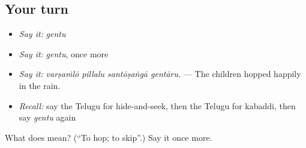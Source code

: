 \subsection*{Your turn}
\begin{itemize}
\raggedright
  \item \emph{Say it:} \emph{gentu}
  \item \emph{Say it:} \emph{gentu}, once more
  \item \emph{Say it:} \emph{varṣaṁlō pillalu santōṣaṅgā gentāru.} — The children hopped happily in the rain.
  \item \emph{Recall:} say the Telugu for hide-and-seek, then the Telugu for kabaddi, then say \emph{gentu} again
\end{itemize}

\begin{tcolorbox}[breakable,colback=teal!4,colframe=teal!35!black,title={Before you move on}]
What does  mean? (\textquotedblleft{}To hop; to skip\textquotedblright{}.) Say it once more.
\end{tcolorbox}
